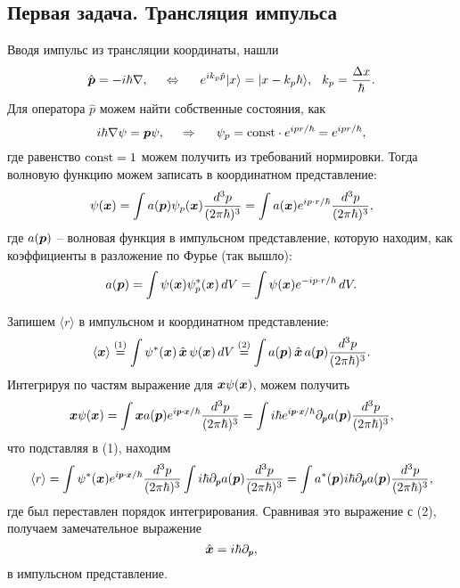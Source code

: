 \subsection*{Первая задача. Трансляция импульса}

Вводя импульс из трансляции координаты, нашли
\begin{equation*}
    \hat{\mbox{\boldmath $p$}} = - i \hbar \nabla,
    \hspace{5 mm} \Leftrightarrow \hspace{5 mm} 
    e^{i k_p \hat{p}} | x \rangle = | x - k_p \hbar \rangle,
    \hspace{2.5 mm} k_p = \frac{\Delta x}{\hbar}.
\end{equation*}
Для оператора $\hat{p}$ можем найти собственные состояния, как
\begin{equation*}
    i \hbar \nabla \psi = \mbox{\boldmath $p$} \psi,
    \hspace{0.5cm} \Rightarrow \hspace{0.5cm}
    \psi_p = \text{const} \cdot e^{i p r / \hbar} =  e^{i p r / \hbar},
\end{equation*}
где равенство $\text{const} = 1$ можем получить из требований нормировки. Тогда волновую функцию можем записать в координатном представление:
\begin{equation*}
    \psi(\mbox{\boldmath $x$}) = \int a(\mbox{\boldmath $p$}) \psi_p (\mbox{\boldmath $x$}) \frac{d^3 p}{(2 \pi \hbar)^3} = 
    \int a(\mbox{\boldmath $x$}) e^{i p \cdot r / \hbar} \frac{d^3 p}{(2 \pi \hbar)^3},
\end{equation*}
где $a(\mbox{\boldmath $p$})$ -- волновая функция в импульсном представление, которую находим, как коэффициенты в разложение по Фурье (так вышло):
\begin{equation*}
    a(\mbox{\boldmath $p$}) = \int \psi(\mbox{\boldmath $x$}) \psi^*_p (\mbox{\boldmath $x$}) \, d V = 
    \int \psi(\mbox{\boldmath $x$}) e^{- i p \cdot r / \hbar}\, d V.
\end{equation*}

Запишем $\langle r\rangle$ в импульсном и координатном представление:
\begin{equation*}
    \langle \mbox{\boldmath $x$} \rangle \overset{(1)}{=}  \int \psi^*(\mbox{\boldmath $x$})\, \hat{\mbox{\boldmath $x$}}\, \psi(\mbox{\boldmath $x$}) \, d V 
    \overset{(2)}{=} \int a(\mbox{\boldmath $p$}) \,\hat{\mbox{\boldmath $x$}}\, a(\mbox{\boldmath $p$}) \frac{d^3 p}{(2 \pi \hbar)^3}.
\end{equation*}
Интегрируя по частям выражение для $\mbox{\boldmath $x$} \psi(\mbox{\boldmath $x$})$, можем получить
\begin{equation*}
    \vc{x} \psi(\vc{x}) = \int \vc{x} a(\vc{p}) e^{i \smallvc{p} \cdot \smallvc{x} / \hbar} \dppp = 
    \int i \hbar e^{i \smallvc{p} \cdot \smallvc{x} / \hbar} \partial_{\smallvc{p}} a(\vc{p}) \dppp,
\end{equation*}
что подставляя в (1), находим
\begin{equation*}
        \langle r\rangle = 
    \int \psi^* (\vc{x}) e^{i \smallvc{p} \cdot \smallvc{x} / \hbar} \dppp
    \int i \hbar \partial_{\smallvc{p}} a(\vc{p}) \dppp = 
    \int a^*(\vc{p}) i \hbar \partial_{\smallvc{p}} a(\vc{p}) \dppp,
\end{equation*}
где был переставлен порядок интегрирования. Сравнивая это выражение с (2), получаем замечательное выражение
\begin{equation*}
    \hat{\vc{x}} = i \hbar \partial_{\smallvc{p}},
\end{equation*}
в импульсном представление. 

